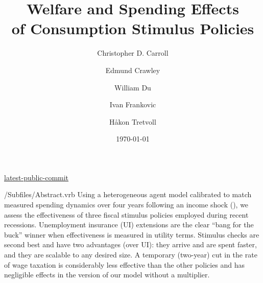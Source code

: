 \documentclass[HAFiscal]{subfiles}
\begin{document}
\hfill{\tiny \href{https://github.com/llorracc/HAFiscal/blob/master/Resources/.git-public-commit}{latest-public-commit}}

\title{Welfare and Spending Effects \\ of Consumption Stimulus Policies}

\author{Christopher D. Carroll\authNum \and Edmund Crawley\authNum \and William Du\authNum \and Ivan Frankovic\authNum \and H{\aa}kon Tretvoll\authNum}

\keywords{}


\date{\today}


\maketitle

\hypertarget{abstract}{}
\begin{verbatimwrite}{\econtexRoot/Subfiles/Abstract.vrb}
  Using a heterogeneous agent model calibrated to match measured spending dynamics over four years following an income shock (\cite{fagereng_mpc_2021}), we assess the effectiveness of three fiscal stimulus policies employed during recent recessions.  Unemployment insurance (UI) extensions are the clear ``bang for the buck'' winner when effectiveness is measured in utility terms.  Stimulus checks are second best and have two advantages (over UI): they arrive and are spent faster, and they are scalable to any desired size.  A temporary (two-year) cut in the rate of wage taxation is considerably less effective than the other policies and has negligible effects in the version of our model without a multiplier.
\end{verbatimwrite}


\hypertarget{links}{}
\end{document}

